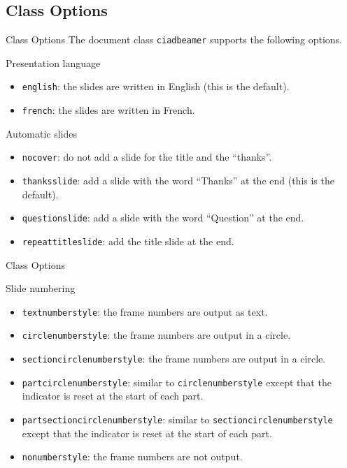 \documentclass[english,sectioncirclenumberstyle]{ciadbeamer}
\begin{document}
\subsection{Class Options}

\begin{frame}[t]{Class Options}
	The document class \texttt{ciadbeamer} supports the following options.
	\begin{block}{Presentation language}
		\begin{itemize}
		\item \texttt{english}: the slides are written in English (this is the default).
		\item \texttt{french}: the slides are written in French.
		\end{itemize}
	\end{block}
	\begin{block}{Automatic slides}
		\begin{itemize}
		\item \texttt{nocover}: do not add a slide for the title and the ``thanks''.
		\item \texttt{thanksslide}: add a slide with the word ``Thanks'' at the end (this is the default). 
		\item \texttt{questionslide}: add a slide with the word ``Question'' at the end. 
		\item \texttt{repeattitleslide}: add the title slide at the end.
		\end{itemize}
	\end{block}
\end{frame}

\begin{frame}[t]{Class Options \insertcontinuationtext}
	\begin{block}{Slide numbering}
		\begin{itemize}
		\item \texttt{textnumberstyle}: the frame numbers are output as text.\hfill\hyperlink{progressbartypes}{}
		\item \texttt{circlenumberstyle}: the frame numbers are output in a circle.\hfill\hyperlink{progressbartypes}{}
		\item \texttt{sectioncirclenumberstyle}: the frame numbers are output in a circle.\hfill\hyperlink{progressbartypes}{}
		\item \texttt{partcirclenumberstyle}: similar to \texttt{circlenumberstyle} except that the indicator is reset at the start of each part.
		\item \texttt{partsectioncirclenumberstyle}: similar to \texttt{sectioncirclenumberstyle} except that the indicator is reset at the start of each part.
		\item \texttt{nonumberstyle}: the frame numbers are not output.
		\end{itemize}
	\end{block}
\end{frame}
\end{document}
